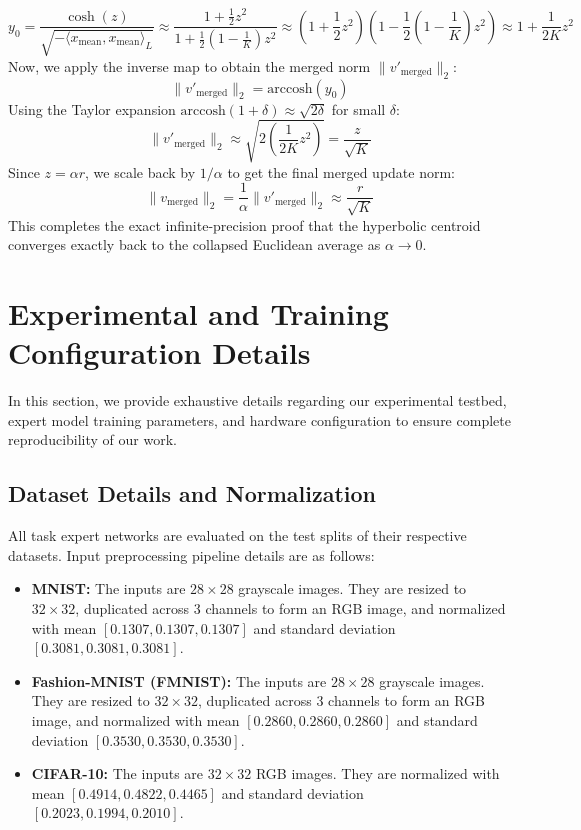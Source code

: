 \documentclass{article}
\theoremstyle{plain}
\theoremstyle{definition}
\theoremstyle{remark}
\begin{document}
$$y_0 = \frac{\cosh(z)}{\sqrt{-\langle x_{\text{mean}}, x_{\text{mean}} \rangle_L}} \approx \frac{1 + \frac{1}{2} z^2}{1 + \frac{1}{2}\left(1 - \frac{1}{K}\right) z^2} \approx \left(1 + \frac{1}{2} z^2\right) \left(1 - \frac{1}{2}\left(1 - \frac{1}{K}\right) z^2\right) \approx 1 + \frac{1}{2K} z^2$$
Now, we apply the inverse map to obtain the merged norm $\|v'_{\text{merged}}\|_2$:
$$\|v'_{\text{merged}}\|_2 = \text{arccosh}(y_0)$$
Using the Taylor expansion $\text{arccosh}(1 + \delta) \approx \sqrt{2\delta}$ for small $\delta$:
$$\|v'_{\text{merged}}\|_2 \approx \sqrt{2 \left(\frac{1}{2K} z^2\right)} = \frac{z}{\sqrt{K}}$$
Since $z = \alpha r$, we scale back by $1/\alpha$ to get the final merged update norm:
$$\|v_{\text{merged}}\|_2 = \frac{1}{\alpha} \|v'_{\text{merged}}\|_2 \approx \frac{r}{\sqrt{K}}$$
This completes the exact infinite-precision proof that the hyperbolic centroid converges exactly back to the collapsed Euclidean average as $\alpha \to 0$.

\section{Experimental and Training Configuration Details}
In this section, we provide exhaustive details regarding our experimental testbed, expert model training parameters, and hardware configuration to ensure complete reproducibility of our work.

\subsection{Dataset Details and Normalization}
All task expert networks are evaluated on the test splits of their respective datasets. Input preprocessing pipeline details are as follows:
\begin{itemize}
    \item \textbf{MNIST:} The inputs are $28 \times 28$ grayscale images. They are resized to $32 \times 32$, duplicated across 3 channels to form an RGB image, and normalized with mean $[0.1307, 0.1307, 0.1307]$ and standard deviation $[0.3081, 0.3081, 0.3081]$.
    \item \textbf{Fashion-MNIST (FMNIST):} The inputs are $28 \times 28$ grayscale images. They are resized to $32 \times 32$, duplicated across 3 channels to form an RGB image, and normalized with mean $[0.2860, 0.2860, 0.2860]$ and standard deviation $[0.3530, 0.3530, 0.3530]$.
    \item \textbf{CIFAR-10:} The inputs are $32 \times 32$ RGB images. They are normalized with mean $[0.4914, 0.4822, 0.4465]$ and standard deviation $[0.2023, 0.1994, 0.2010]$.
\end{itemize}
\end{document}
